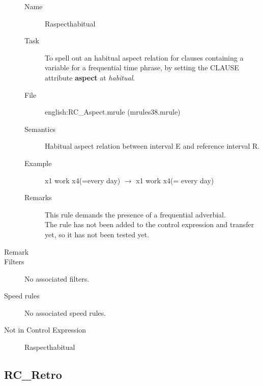 \begin{description}
\vspace{1 cm}
\begin{description}
\item[Name] Raspecthabitual
\item[Task] To spell out an habitual aspect relation for clauses containing 
a variable for a frequential time phrase, by setting the CLAUSE attribute {\bf
aspect} at {\em habitual\/}.
\item[File] english:RC\_Aspect.mrule (mrules38.mrule)
\item[Semantics] Habitual aspect relation between interval E and reference 
interval R.
\item[Example] x1 work x4(=every day) $\rightarrow$ x1 work x4(= every day)
\item[Remarks] This rule demands the presence of a frequential 
adverbial.\\
The rule has not been added to the control expression and transfer yet, so it 
has not been tested yet. 
\end{description}

\item[Remark]

\item [Filters] No associated filters.
\item [Speed rules] No associated speed rules.
\item [Not in Control Expression] Raspecthabitual
\end{description}

\newpage
\subsection{RC\_Retro}

